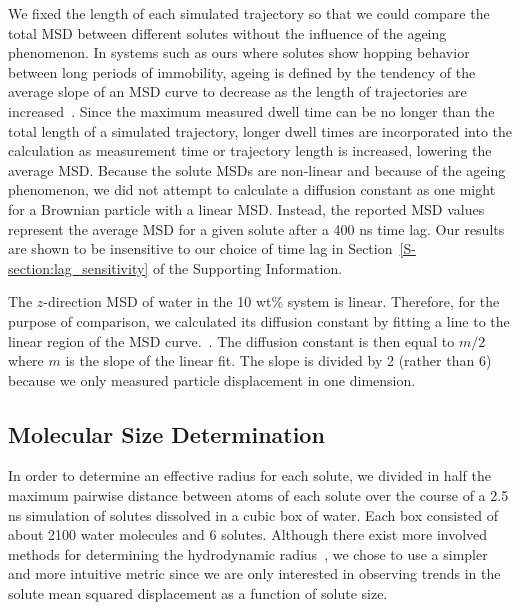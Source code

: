 \documentclass[journal=jpcbfk,manuscript=article]{achemso}
\begin{document}
  We fixed the length of each simulated trajectory so that we could compare the total
  MSD between different solutes without the influence of the ageing phenomenon.
  In systems such as ours where solutes show hopping behavior between long periods 
  of immobility, ageing is defined by the tendency of the average slope of an MSD 
  curve to decrease as the length of trajectories are increased~\cite{metzler_anomalous_2014}.
  Since the maximum measured dwell time can be no longer than the total length of a simulated
  trajectory, longer dwell times are incorporated into the calculation as measurement
  time or trajectory length is increased, lowering the average MSD. Because the solute 
  MSDs are non-linear and because of the ageing phenomenon, we did not attempt to calculate
  a diffusion constant as one might for a Brownian particle with a linear MSD. Instead,
  the reported MSD values represent the average MSD for a given	solute after a 400
  ns time lag. Our results are shown to be insensitive to our choice of time lag in 
  Section~\ref{S-section:lag_sensitivity} of the Supporting Information.
  
  The $z$-direction MSD of water in the 10 wt\% system is linear. Therefore, for
  the purpose of comparison, we calculated its diffusion constant by fitting a line
  to the linear region of the MSD curve.~\cite{maginn_best_2018}. The diffusion constant
  is then equal to $m/2$ where $m$ is the slope of the linear fit. The slope is divided
  by 2 (rather than 6) because we only measured 
  particle displacement
  in one dimension.

  \subsection{Molecular Size Determination}\label{method:molecular_size}
  
  In order to determine an effective radius for each solute, we divided in 
  half the maximum pairwise distance between atoms of each solute over the course of
  a 2.5 ns simulation of solutes dissolved in a cubic box of water. Each box 
  consisted of about 2100 water molecules and 6 solutes. Although there exist
  more involved methods for determining the hydrodynamic radius~\cite{schultz_determination_1961},
  we chose to use a simpler and more intuitive metric since we are only interested
  in observing trends in the solute mean squared displacement as a function
  of solute size.
  
\end{document}

